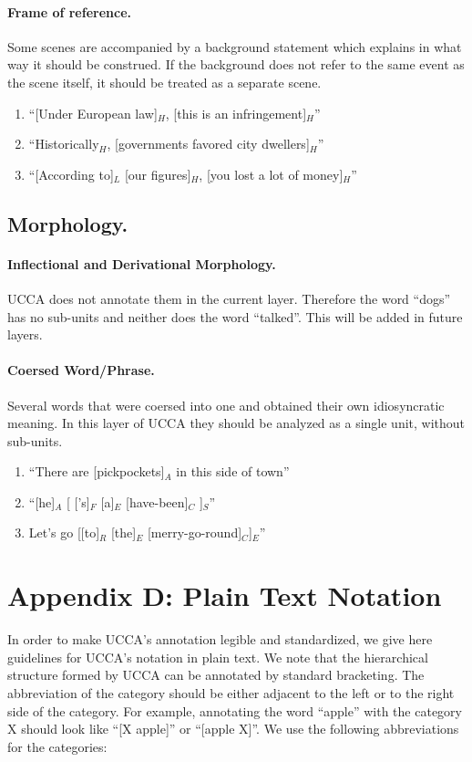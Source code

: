 \documentclass[11pt]{article}
\newcommand{\be}{\begin{enumerate}}
\newcommand{\ee}{\end{enumerate}}
\begin{document}
\paragraph{Frame of reference.} Some scenes are accompanied by a background statement which explains in what way it should be construed. If the background does not refer to the same event as the scene itself, it should be treated as a separate scene.
\be \item
``[Under European law]$_H$, [this is an infringement]$_H$''
\item
``Historically$_H$, [governments favored city dwellers]$_H$''
\item
``[According to]$_L$ [our figures]$_H$, [you lost a lot of money]$_H$''
\ee

\subsection*{Morphology.}

\paragraph{Inflectional and Derivational Morphology.} UCCA does not annotate them in the current layer. Therefore the word ``dogs'' has no sub-units and neither does the word ``talked''. This will be added in future layers.

\paragraph{Coersed Word/Phrase.}
Several words that were coersed into one and obtained their own idiosyncratic meaning. In this layer of UCCA they should be analyzed as a single unit, without sub-units.
\be \item
``There are [pickpockets]$_A$ in this side of town''
\item
``[he]$_A$ [ ['s]$_F$ [a]$_E$ [have-been]$_C$ ]$_S$''
\item
Let's go [[to]$_R$ [the]$_E$ [merry-go-round]$_C$]$_E$''
\ee

\section*{Appendix D: Plain Text Notation}


In order to make UCCA's annotation legible and standardized, we give here guidelines for UCCA's notation in plain text. We note that the hierarchical structure formed by UCCA can be annotated by standard bracketing. The abbreviation of the category should be either adjacent to the left or to the right side of the category.
For example, annotating the word ``apple'' with the category X should look like ``[X apple]'' or ``[apple X]''.
We use the following abbreviations for the categories:\\
\end{document}
